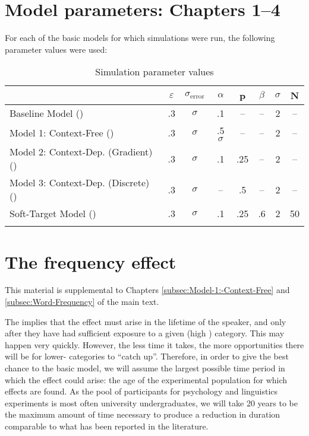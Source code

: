 \chapter{\label{chap:Appendix A}Model parameters: Chapters 1--4}

For each of the basic  models for which simulations were run,
the following parameter values were used:

\begin{table}[H]\footnotesize
\caption{Simulation parameter values}
\begin{tabular}{lS[table-format=1.1]cS[table-format=1.1]S[table-format=1.1]S[table-format=1.1]cc}
\lsptoprule
 & {$\varepsilon$} & {$\sigma_{\text{error}}$} & $\alpha$ & {p} & {$\beta$} & $\sigma$ & {N}\tabularnewline
\midrule
Baseline Model () & .3 & $\sigma$ & .1 & – & – & 2 & –\tabularnewline
Model 1: Context-Free () & .3 & $\sigma$ & .5$\sigma$ & – & – & 2 & –\tabularnewline
Model 2: Context-Dep. (Gradient) () & .3 & $\sigma$ & .1 & .25 & – & 2 & –\tabularnewline
Model 3: Context-Dep. (Discrete) () & .3 & $\sigma$ & – & .5 & – & 2 & –\tabularnewline
Soft-Target Model () & .3 & $\sigma$ & .1 & .25 & .6 & 2 & 50\tabularnewline
\lspbottomrule
\end{tabular}

\end{table}


\chapter{\label{chap:Appendix B}The frequency effect}

This material is supplemental to Chapters \ref{subsec:Model-1:-Context-Free}
and \ref{subsec:Word-Frequency} of the main text.

The  implies that the  effect must arise in
the lifetime of the speaker, and only after they have had sufficient
exposure to a given (high ) category. This may happen very
quickly. However, the less time it takes, the more opportunities there
will be for lower- categories to “catch up”. Therefore,
in order to give the best chance to the basic model, we will assume
the largest possible time period in which the effect could arise:
the age of the experimental population for which  effects
are found. As the pool of participants for psychology and linguistics
experiments is most often university undergraduates, we will take
20 years to be the maximum amount of time necessary to produce a reduction
in duration comparable to what has been reported in the literature.

